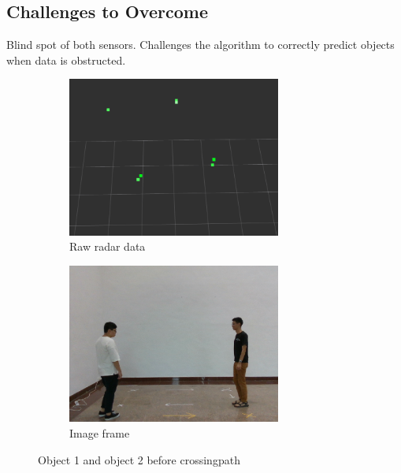 \subsection{Challenges to Overcome}\label{sec:3-challenge}
Blind spot of both sensors.
Challenges the algorithm to correctly predict objects when data is obstructed.
\begin{figure}[hbpt]
    \centering
    \begin{subfigure}{0.3\linewidth}
        \includegraphics[width=7cm]{Figures/before_conceal_radar.png}
        \caption{Raw radar data}
        \label{subfig:before_conceal_radar_fig}
    \end{subfigure}
    \hspace{0.15\textwidth}
    \begin{subfigure}{0.3\linewidth}
        \includegraphics[width=7cm]{Figures/before_conceal_image.png}
        \caption{Image frame}
        \label{subfig:before_conceal_image_fig}
    \end{subfigure}

    \caption{Object 1 and object 2 before crossingpath}
    \label{fig:before_conceal_fig}
\end{figure}

